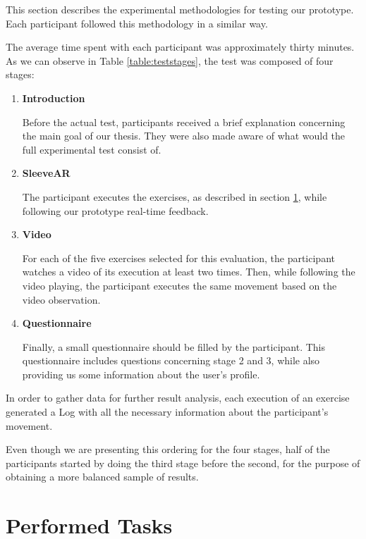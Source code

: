 This section describes the experimental methodologies for testing our prototype. Each participant followed this methodology in a similar way.

The average time spent with each participant was approximately thirty minutes. As we can observe in Table \ref{table:teststages}, the test was composed of four stages:

\begin{enumerate}
\item \textbf{Introduction}

Before the actual test, participants received a brief explanation concerning the main goal of our thesis. They were also made aware of what would the full experimental test consist of.

\item \textbf{SleeveAR}

The participant executes the exercises, as described in section \ref{evaluation-tasks}, while following our prototype real-time feedback.

\item \textbf{Video}

For each of the five exercises selected for this evaluation, the participant  watches a video of its execution at least two times. Then, while following the video playing, the participant executes the same movement based on the video observation.

\item \textbf{Questionnaire}

Finally, a small questionnaire should be filled by the participant. This questionnaire includes questions concerning stage 2 and 3, while also providing us some information about the user's profile.


\end{enumerate}

In order to gather data for further result analysis, each execution of an exercise generated a Log with all the necessary information about the participant's movement.

Even though we are presenting this ordering for the four stages, half of the participants started by doing the third stage before the second, for the purpose of obtaining a more balanced sample of results.

\section{Performed Tasks} \label{evaluation-tasks}


